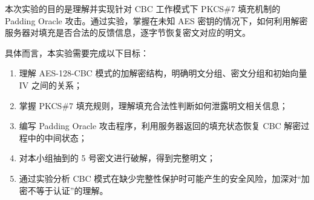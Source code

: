 本次实验的目的是理解并实现针对 CBC 工作模式下 PKCS\#7 填充机制的 Padding Oracle 攻击。通过实验，掌握在未知 AES 密钥的情况下，如何利用解密服务器对填充是否合法的反馈信息，逐字节恢复密文对应的明文。

具体而言，本实验需要完成以下目标：

\begin{enumerate}
    \item 理解 AES-128-CBC 模式的加解密结构，明确明文分组、密文分组和初始向量 IV 之间的关系；
    \item 掌握 PKCS\#7 填充规则，理解填充合法性判断如何泄露明文相关信息；
    \item 编写 Padding Oracle 攻击程序，利用服务器返回的填充状态恢复 CBC 解密过程中的中间状态；
    \item 对本小组抽到的 5 号密文进行破解，得到完整明文；
    \item 通过实验分析 CBC 模式在缺少完整性保护时可能产生的安全风险，加深对“加密不等于认证”的理解。
\end{enumerate}